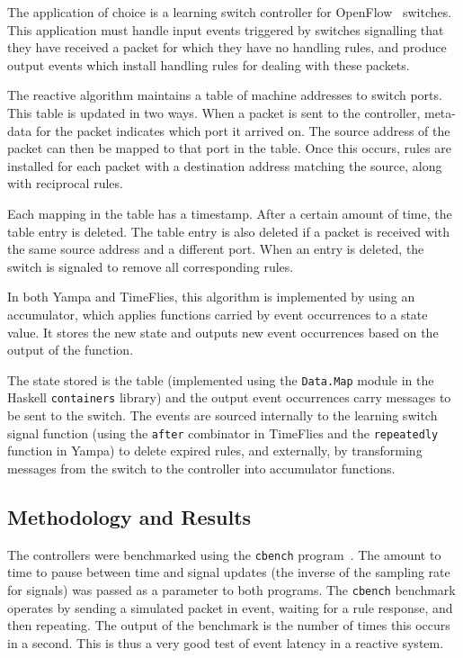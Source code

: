 The application of choice is a learning switch controller for OpenFlow~\cite{OpenflowSpec}
switches. This application must handle input events triggered by switches
signalling that they have received a packet for which they have no handling
rules, and produce output events which install handling rules for dealing with
these packets.

The reactive algorithm maintains a table of machine addresses to switch ports.
This table is updated in two ways. When a packet is sent to the controller,
meta-data for the packet indicates which port it arrived on. The source address
of the packet can then be mapped to that port in the table. Once this occurs,
rules are installed for each packet with a destination address matching the
source, along with reciprocal rules.

Each mapping in the table has a timestamp. After a certain amount of time, the
table entry is deleted. The table entry is also deleted if a packet is received
with the same source address and a different port. When an entry is deleted,
the switch is signaled to remove all corresponding rules.

In both Yampa and TimeFlies, this algorithm is implemented by using an accumulator,
which applies functions carried by event occurrences to a state value. It stores
the new state and outputs new event occurrences based on the output of the function.

The state stored is the table (implemented using the {\tt Data.Map} module in the
Haskell {\tt containers} library) and the output event occurrences carry messages
to be sent to the switch. The events are sourced internally to the learning
switch signal function (using the {\tt after} combinator in TimeFlies and the {\tt repeatedly}
function in Yampa) to delete expired rules, and externally, by transforming messages
from the switch to the controller into accumulator functions.

\subsection{Methodology and Results}
\label{subsection:Evaluation_and_Comparisons-Methodology_and_Results}

The controllers were benchmarked using the {\tt cbench} program~\cite{cbench}. The
amount to time to pause between time and signal updates (the inverse of the sampling rate for signals)
was passed as a parameter to both programs. The {\tt cbench} benchmark operates by sending a simulated packet in
event, waiting for a rule response, and then repeating. The output of the benchmark
is the number of times this occurs in a second. This is thus a very good test of
event latency in a reactive system.

